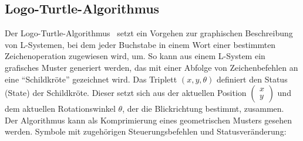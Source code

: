 \subsection*{Logo-Turtle-Algorithmus}
Der Logo-Turtle-Algorithmus~\cite{prusinkiewicz_1986} setzt ein Vorgehen zur graphischen Beschreibung von L-Systemen, bei dem
jeder Buchstabe in einem Wort einer bestimmten Zeichenoperation zugewiesen wird, um.
So kann aus einem L-System ein grafisches Muster generiert werden, das mit einer Abfolge von Zeichenbefehlen an
eine "`Schildkröte"' gezeichnet wird.
Das Triplett $(x,y,\theta)$ definiert den Status (State) der Schildkröte.
Dieser setzt sich aus der aktuellen Position $\left(\begin{smallmatrix} x \\ y \end{smallmatrix}\right)$ und dem
aktuellen Rotationswinkel $\theta$, der die Blickrichtung bestimmt, zusammen.\\
Der Algorithmus kann als Komprimierung eines geometrischen Musters gesehen werden.
Symbole mit zugehörigen Steuerungsbefehlen und Statusveränderung:
